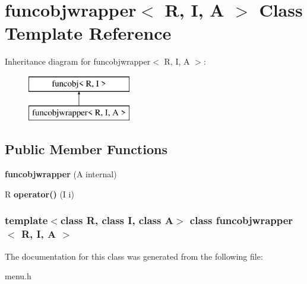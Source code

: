 \hypertarget{classfuncobjwrapper}{\section{funcobjwrapper$<$ R, I, A $>$ Class Template Reference}
\label{classfuncobjwrapper}
}
Inheritance diagram for funcobjwrapper$<$ R, I, A $>$\-:\begin{figure}[H]
\begin{center}
\leavevmode
\includegraphics[height=2.000000cm]{classfuncobjwrapper}
\end{center}
\end{figure}
\subsection*{Public Member Functions}
\begin{DoxyCompactItemize}
\item 
\hypertarget{classfuncobjwrapper_a3824a1feca3b6905bc87881f85946c69}{{\bfseries funcobjwrapper} (A internal)}\label{classfuncobjwrapper_a3824a1feca3b6905bc87881f85946c69}

\item 
\hypertarget{classfuncobjwrapper_a5b6f835278f661b86c3fc6eb54e0d506}{R {\bfseries operator()} (I i)}\label{classfuncobjwrapper_a5b6f835278f661b86c3fc6eb54e0d506}

\end{DoxyCompactItemize}
\subsubsection*{template$<$class R, class I, class A$>$ class funcobjwrapper$<$ R, I, A $>$}



The documentation for this class was generated from the following file\-:\begin{DoxyCompactItemize}
\item 
menu.\-h\end{DoxyCompactItemize}

